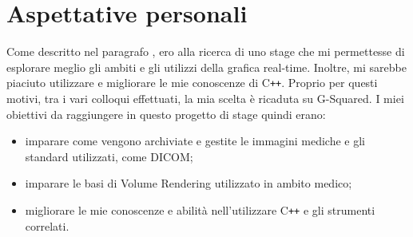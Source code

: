 \section{Aspettative personali}
Come descritto nel paragrafo , ero alla ricerca di uno stage che mi permettesse di esplorare meglio gli ambiti e gli utilizzi della grafica real-time. Inoltre, mi sarebbe piaciuto utilizzare e migliorare le mie conoscenze di C\texttt{++}. Proprio per questi motivi, tra i vari colloqui effettuati, la mia scelta è ricaduta su G-Squared. I miei obiettivi da raggiungere in questo progetto di stage quindi erano:
\begin{itemize}
\item imparare come vengono archiviate e gestite le immagini mediche e gli standard utilizzati, come DICOM;
\item imparare le basi di Volume Rendering utilizzato in ambito medico;
\item migliorare le mie conoscenze e abilità nell'utilizzare C\texttt{++} e gli strumenti correlati.
\end{itemize}